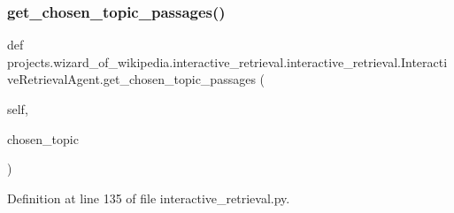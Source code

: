 \subsubsection{\texorpdfstring{get\+\_\+chosen\+\_\+topic\+\_\+passages()}{get\_chosen\_topic\_passages()}}
{\footnotesize\ttfamily def projects.\+wizard\+\_\+of\+\_\+wikipedia.\+interactive\+\_\+retrieval.\+interactive\+\_\+retrieval.\+Interactive\+Retrieval\+Agent.\+get\+\_\+chosen\+\_\+topic\+\_\+passages (\begin{DoxyParamCaption}\item[{}]{self,  }\item[{}]{chosen\+\_\+topic }\end{DoxyParamCaption})}



Definition at line 135 of file interactive\+\_\+retrieval.\+py.


